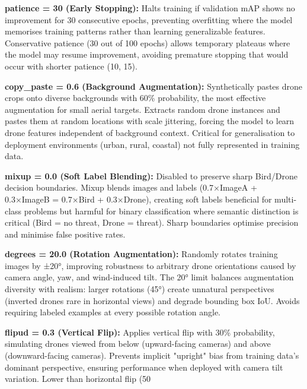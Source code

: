 \documentclass[12pt,a4paper]{report}
\begin{document}
\textbf{patience = 30 (Early Stopping):}
Halts training if validation mAP shows no improvement for 30 consecutive epochs, preventing overfitting where the model memorises training patterns rather than learning generalizable features. Conservative patience (30 out of 100 epochs) allows temporary plateaus where the model may resume improvement, avoiding premature stopping that would occur with shorter patience (10, 15).

\textbf{copy\_paste = 0.6 (Background Augmentation):}
Synthetically pastes drone crops onto diverse backgrounds with 60\% probability, the most effective augmentation for small aerial targets. Extracts random drone instances and pastes them at random locations with scale jittering, forcing the model to learn drone features independent of background context. Critical for generalisation to deployment environments (urban, rural, coastal) not fully represented in training data.

\textbf{mixup = 0.0 (Soft Label Blending):}
Disabled to preserve sharp Bird/Drone decision boundaries. Mixup blends images and labels (0.7×ImageA + 0.3×ImageB = 0.7×Bird + 0.3×Drone), creating soft labels beneficial for multi-class problems but harmful for binary classification where semantic distinction is critical (Bird = no threat, Drone = threat). Sharp boundaries optimise precision and minimise false positive rates.

\textbf{degrees = 20.0 (Rotation Augmentation):}
Randomly rotates training images by ±20°, improving robustness to arbitrary drone orientations caused by camera angle, yaw, and wind-induced tilt. The 20° limit balances augmentation diversity with realism: larger rotations (45°) create unnatural perspectives (inverted drones rare in horizontal views) and degrade bounding box IoU. Avoids requiring labeled examples at every possible rotation angle.

\textbf{flipud = 0.3 (Vertical Flip):}
Applies vertical flip with 30\% probability, simulating drones viewed from below (upward-facing cameras) and above (downward-facing cameras). Prevents implicit "upright" bias from training data's dominant perspective, ensuring performance when deployed with camera tilt variation. Lower than horizontal flip (50%
\end{document}

